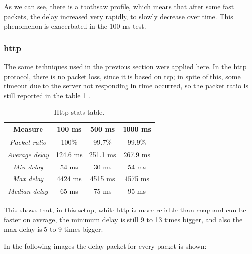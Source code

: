 \documentclass[]{article}
\begin{document}
\begin{figure}[h]
\begin{subfigure}{0.5\textwidth}
		\caption{}
		\label{fig:coap1000ms}
	\end{subfigure}
	
\end{figure}



As we can see, there is a toothsaw profile, which means that after some fast packets, the delay increased very rapidly, to slowly decrease over time. This phenomenon is exacerbated in the 100 ms test. 

\subsubsection{http}

The same techniques used in the previous section were applied here. In the http protocol, there is no packet loss, since it is based on tcp; in spite of this, some timeout due to the server not responding in time occurred, so the packet ratio is still reported in the table \ref{http} .

\begin{table}
	\centering
	\begin{tabular}{|c|c|c|c|}
		\hline
		\textbf{Measure} & \textbf{100 ms} & \textbf{500 ms} & \textbf{1000 ms} \\
		\hline
		\textit{Packet ratio} & 100\% & 99.7\%  & 99.9\% \\
		\hline
		\textit{Average delay} & 124.6 ms & 251.1 ms & 267.9 ms \\
		\hline
		\textit{Min delay} & 54 ms & 30 ms & 54 ms \\
		\hline
		\textit{Max delay} & 4424 ms & 4515 ms & 4575 ms \\
		\hline
		\textit{Median delay} & 65 ms & 75 ms & 95 ms \\
		\hline
	\end{tabular} 
	\caption{\label{http}Http stats table.}
\end{table}

This shows that, in this setup, while http is more reliable than coap and can be faster on average, the minimum delay is still 9 to 13 times bigger, and also the max delay is 5 to 9 times bigger. 

In the following images the delay packet for every packet is shown:
\end{document}
